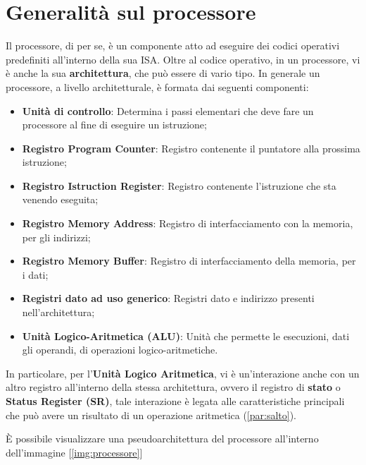 \section{Generalità sul processore}
Il processore, di per se, è un componente atto ad eseguire dei codici operativi predefiniti all'interno della sua ISA.
Oltre al codice operativo, in un processore, vi è anche la sua \textbf{architettura}, che può essere di vario tipo. In generale un processore, a livello architetturale, è formata dai seguenti componenti:
\begin{itemize}
    \item \textbf{Unità di controllo}: Determina i passi elementari che deve fare un processore al fine di eseguire un istruzione;
    \item \textbf{Registro Program Counter}: Registro contenente il puntatore alla prossima istruzione;
    \item \textbf{Registro Istruction Register}: Registro contenente l'istruzione che sta venendo eseguita;
    \item \textbf{Registro Memory Address}: Registro di interfacciamento con la memoria, per gli indirizzi;
    \item \textbf{Registro Memory Buffer}: Registro di interfacciamento della memoria, per i dati;
    \item \textbf{Registri dato ad uso generico}: Registri dato e indirizzo presenti nell'architettura;
    \item \textbf{Unità Logico-Aritmetica (ALU)}: Unità che permette le esecuzioni, dati gli operandi, di operazioni logico-aritmetiche.
\end{itemize}

In particolare, per l'\textbf{Unità Logico Aritmetica}, vi è un'interazione anche con un altro registro all'interno della stessa architettura, ovvero il registro di \textbf{stato} o \textbf{Status Register (SR)}, tale interazione è legata alle caratteristiche principali che può avere un risultato di un operazione aritmetica (\ref{par:salto}).

\uppercase{è} possibile visualizzare una pseudoarchitettura del processore all'interno dell'immagine [\ref{img:processore}]


